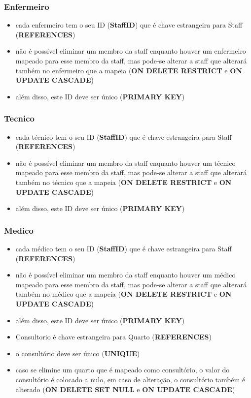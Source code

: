 \documentclass[article, a4paper, 12pt, oneside]{memoir}
\begin{document}
\subsubsection*{Enfermeiro}
\begin{itemize}
	\item cada enfermeiro tem o seu ID (\textbf{StaffID}) que é chave estrangeira para Staff (\textbf{REFERENCES})
	\item não é possível eliminar um membro da staff enquanto houver um enfermeiro mapeado para esse membro da staff, mas pode-se alterar a staff que alterará também no enfermeiro que a mapeia (\textbf{ON DELETE RESTRICT} e \textbf{ON UPDATE CASCADE})
	\item além disso, este ID deve ser único (\textbf{PRIMARY KEY})
\end{itemize}

\subsubsection*{Tecnico}
\begin{itemize}
	\item cada técnico tem o seu ID (\textbf{StaffID}) que é chave estrangeira para Staff (\textbf{REFERENCES})
	\item não é possível eliminar um membro da staff enquanto houver um técnico mapeado para esse membro da staff, mas pode-se alterar a staff que alterará também no técnico que a mapeia (\textbf{ON DELETE RESTRICT} e \textbf{ON UPDATE CASCADE})
	\item além disso, este ID deve ser único (\textbf{PRIMARY KEY})
\end{itemize}

\subsubsection*{Medico}
\begin{itemize}
	\item cada médico tem o seu ID (\textbf{StaffID}) que é chave estrangeira para Staff (\textbf{REFERENCES})
	\item não é possível eliminar um membro da staff enquanto houver um médico mapeado para esse membro da staff, mas pode-se alterar a staff que alterará também no médico que a mapeia (\textbf{ON DELETE RESTRICT} e \textbf{ON UPDATE CASCADE})
	\item além disso, este ID deve ser único (\textbf{PRIMARY KEY})
	\item Consultorio é chave estrangeira para Quarto (\textbf{REFERENCES})
	\item o consultório deve ser único (\textbf{UNIQUE})
	\item caso se elimine um quarto que é mapeado como consultório, o valor do consultório é colocado a nulo, em caso de alteração, o consultório também é alterado (\textbf{ON DELETE SET NULL} e \textbf{ON UPDATE CASCADE})
\end{itemize}
\end{document}
